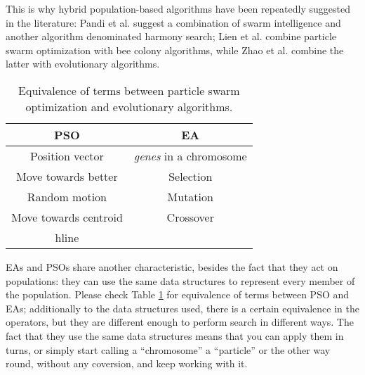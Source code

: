 This
is why hybrid population-based algorithms have been repeatedly
suggested in the literature: Pandi et al. \cite{pandi2011dynamic}
suggest a combination of swarm intelligence and another algorithm
denominated harmony search; Lien et al. \cite{lien2012hybrid} combine
particle swarm optimization with bee colony algorithms, while Zhao et
al. \cite{zhao2010hybrid} combine the latter with evolutionary
algorithms.

\begin{table}[h!tb]
    \caption{Equivalence of terms between particle swarm optimization
    and evolutionary algorithms. \label{tab:equivalence}}
\centering
\begin{tabular}{|c|c|}
  PSO & EA \\ \hline
  Position vector & {\em genes} in a chromosome \\ \hline
  Move towards better & Selection  \\ \hline
  Random motion & Mutation \\ \hline
  Move towards centroid & Crossover \\ hline
\end{tabular}
\end{table}
%
EAs and PSOs share another characteristic, besides the fact that they
act on populations: they can use the same data structures to
represent every member of the population. Please check Table
\ref{tab:equivalence} for equivalence of terms between PSO and EAs;
additionally to the data structures used, there is a certain
equivalence in the operators, but they are different enough to perform
search in different ways. The fact that they use the same data
structures means that you can apply them in turns, or simply start
calling a ``chromosome'' a ``particle'' or the other way round,
without any coversion, and keep working with it.


